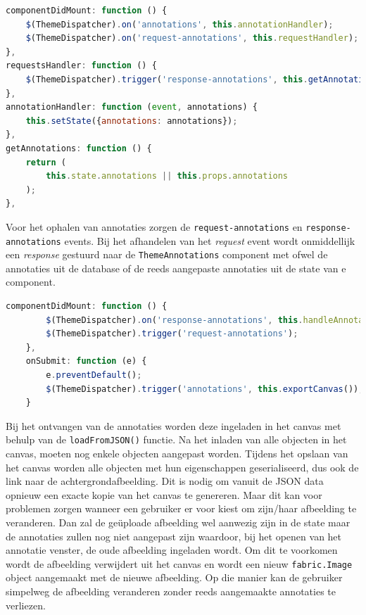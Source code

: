 \begin{lstlisting}[caption={Theme component - events},label=lst:ThemeDispatcherEventsTheme,language=javascript]
componentDidMount: function () {
	$(ThemeDispatcher).on('annotations', this.annotationHandler);
	$(ThemeDispatcher).on('request-annotations', this.requestHandler);
},
requestsHandler: function () {
	$(ThemeDispatcher).trigger('response-annotations', this.getAnnotations());
},
annotationHandler: function (event, annotations) {
	this.setState({annotations: annotations});
},
getAnnotations: function () {
	return (
		this.state.annotations || this.props.annotations
	);
},
\end{lstlisting}

Voor het ophalen van annotaties zorgen de \texttt{request-annotations} en \texttt{response-annotations} events. Bij het afhandelen van het \textit{request} event wordt onmiddellijk een \textit{response} gestuurd naar de \texttt{ThemeAnnotations} component met ofwel de annotaties uit de database of de reeds aangepaste annotaties uit de state van e component. 

\begin{lstlisting}[caption={ThemeAnnotations component - events},label=lst:ThemeDispatcherEventsThemeAnnotations,language=javascript]
	componentDidMount: function () {
	  	$(ThemeDispatcher).on('response-annotations', this.handleAnnotations);
		$(ThemeDispatcher).trigger('request-annotations');
	},
	onSubmit: function (e) {
		e.preventDefault();
		$(ThemeDispatcher).trigger('annotations', this.exportCanvas());
	}
\end{lstlisting}

Bij het ontvangen van de annotaties worden deze ingeladen in het canvas met behulp van de \texttt{loadFromJSON()} functie. Na het inladen van alle objecten in het canvas, moeten nog enkele objecten aangepast worden. Tijdens het opslaan van het canvas worden alle objecten met hun eigenschappen geserialiseerd, dus ook de link naar de achtergrondafbeelding. Dit is nodig om vanuit de JSON data opnieuw een exacte kopie van het canvas te genereren. Maar dit kan voor problemen zorgen wanneer een gebruiker er voor kiest om zijn/haar afbeelding te veranderen. Dan zal de ge\"{u}ploade afbeelding wel aanwezig zijn in de state maar de annotaties zullen nog niet aangepast zijn waardoor, bij het openen van het annotatie venster, de oude afbeelding ingeladen wordt. Om dit te voorkomen wordt de afbeelding verwijdert uit het canvas en wordt een nieuw \texttt{fabric.Image} object aangemaakt met de nieuwe afbeelding. Op die manier kan de gebruiker simpelweg de afbeelding veranderen zonder reeds aangemaakte annotaties te verliezen. 

